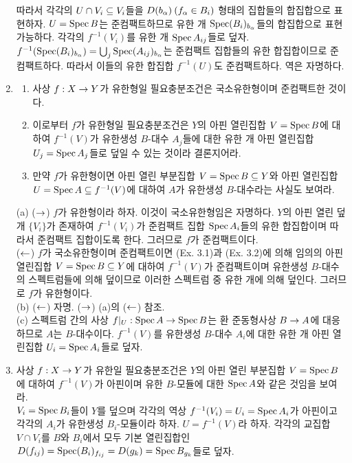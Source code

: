 \begin{enumerate}[label=\tb{3.\arabic*.},itemindent=0mm,itemsep=4mm]
	따라서 각각의 $U\cap V_i\subseteq V_i$들을 $D(b_\alpha)\:(f_\alpha\in B_i)$ 형태의 집합들의 합집합으로 표현하자.
	$U=\operatorname{Spec} B$는 준컴팩트하므로 유한 개 $\operatorname{Spec} (B_i)_{b_\alpha}$들의 합집합으로 표현 가능하다.
	각각의 $f^{-1}(V_i)$를 유한 개 $\operatorname{Spec} A_{ij}$들로 덮자.
	$f^{-1}(\operatorname{Spec}(B_i)_{b_\alpha})=\bigcup_j\operatorname{Spec}(A_{ij})_{b_\alpha}$는 준컴팩트 집합들의 유한 합집합이므로 준컴팩트하다.
	따라서 이들의 유한 합집합 $f^{-1}(U)$도 준컴팩트하다. 역은 자명하다.
	\item \begin{enumerate}[label=(\alph*)]
	\item 사상 $f:X\rightarrow Y$가 유한형일 필요충분조건은 국소유한형이며 준컴팩트한 것이다.
	\item 이로부터 $f$가 유한형일 필요충분조건은 $Y$의  아핀 열린집합 $V=\operatorname{Spec} B$에 대하여
	$f^{-1}(V)$가 유한생성 $B$-대수 $A_j$들에 대한 유한 개 아핀 열린집합 $U_j=\operatorname{Spec} A_j$들로 덮일 수 있는 것이라 결론지어라.
	\item 만약 $f$가 유한형이면  아핀 열린 부분집합 $V=\operatorname{Spec} B\subseteq Y$와
	 아핀 열린집합 $U=\operatorname{Spec} A\subseteq f^{-1}(V)$에 대하여 $A$가 유한생성 $B$-대수라는 사실도 보여라.
	\end{enumerate}
	\sol (a) ($\rightarrow$) $f$가 유한형이라 하자. 이것이 국소유한형임은 자명하다. $Y$의 아핀 열린 덮개 $\{V_i\}$가 존재하여
	$f^{-1}(V_i)$가 준컴팩트 집합 $\operatorname{Spec} A_i$들의 유한 합집합이며 따라서 준컴팩트 집합이도록 한다. 그러므로 $f$가 준컴팩트이다.\\
	($\leftarrow$) $f$가 국소유한형이며 준컴팩트이면 (Ex. 3.1)과 (Ex. 3.2)에 의해
	임의의 아핀 열린집합 $V=\operatorname{Spec} B\subseteq Y$에 대하여 $f^{-1}(V)$가 준컴팩트이며 유한생성 $B$-대수의 스펙트럼들에 의해 덮이므로
	이러한 스펙트럼 중 유한 개에 의해 덮인다. 그러므로 $f$가 유한형이다.\\
	(b) ($\leftarrow$) 자명. ($\rightarrow$) (a)의 ($\leftarrow$) 참조.\\
	(c) 스펙트럼 간의 사상 $f|_U:\operatorname{Spec} A\rightarrow\operatorname{Spec} B$는 환 준동형사상 $B\rightarrow A$에 대응하므로 $A$는 $B$-대수이다.
	$f^{-1}(V)$를 유한생성 $B$-대수 $A_i$에 대한 유한 개 아핀 열린집합 $U_i=\operatorname{Spec} A_i$들로 덮자.
	\item 사상 $f:X\rightarrow Y$가 유한일 필요충분조건은 $Y$의  아핀 열린 부분집합 $V=\operatorname{Spec} B$에 대하여
	$f^{-1}(V)$가 아핀이며 유한 $B$-모듈에 대한 $\operatorname{Spec} A$와 같은 것임을 보여라.\\
	\sol $V_i=\operatorname{Spec} B_i$들이 $Y$를 덮으며 각각의 역상 $f^{-1}(V_i)=U_i=\operatorname{Spec} A_i$가 아핀이고
	각각의 $A_i$가 유한생성 $B_i$-모듈이라 하자. $U=f^{-1}(V)$라 하자.
	각각의 교집합 $V\cap V_i$를 $B$와 $B_i$에서 모두 기본 열린집합인 $D(f_{ij})=\operatorname{Spec} (B_i)_{f_{ij}}=D(g_k)=\operatorname{Spec} B_{g_k}$들로 덮자.

\end{enumerate}
